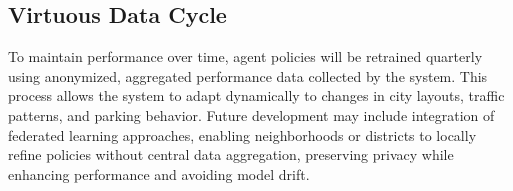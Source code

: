 \subsection{Virtuous Data Cycle}

To maintain performance over time, agent policies will be retrained quarterly using anonymized, aggregated performance data collected by the system. This process allows the system to adapt dynamically to changes in city layouts, traffic patterns, and parking behavior. Future development may include integration of federated learning approaches, enabling neighborhoods or districts to locally refine policies without central data aggregation, preserving privacy while enhancing performance and avoiding model drift.